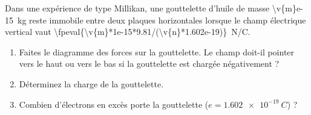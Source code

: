 Dans une expérience de type Millikan, une gouttelette d'huile de masse \qty{\v{m}e-15}{kg} reste immobile entre deux plaques horizontales lorsque le champ électrique vertical vaut \qty[round-mode=figures,round-precision=4]{\fpeval{\v{m}*1e-15*9.81/(\v{n}*1.602e-19)}}{N/C}.

\begin{enumerate}[label=\alph*)]
    \item Faites le diagramme des forces sur la gouttelette. Le champ doit-il pointer vers le haut ou vers le bas si la gouttelette est chargée négativement ?
    \item Déterminez la charge de la gouttelette.
    \item Combien d'électrons en excès porte la gouttelette ($e = \qty{1.602e-19}{C}$) ?
\end{enumerate}
